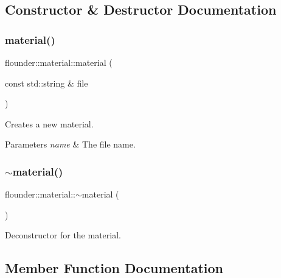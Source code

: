 \subsection{Constructor \& Destructor Documentation}
\mbox{\label{classflounder_1_1material_a92098b1119ad0fa59ca131410cbaf762}} 
\subsubsection{\texorpdfstring{material()}{material()}}
{\footnotesize\ttfamily flounder\+::material\+::material (\begin{DoxyParamCaption}\item[{const std\+::string \&}]{file }\end{DoxyParamCaption})}



Creates a new material. 


\begin{DoxyParams}{Parameters}
{\em name} & The file name. \\
\hline
\end{DoxyParams}
\mbox{\label{classflounder_1_1material_a9091fb3ad0368b98413568ccef5dbdb7}} 
\subsubsection{\texorpdfstring{$\sim$material()}{~material()}}
{\footnotesize\ttfamily flounder\+::material\+::$\sim$material (\begin{DoxyParamCaption}{ }\end{DoxyParamCaption})}



Deconstructor for the material. 



\subsection{Member Function Documentation}
\mbox{\label{classflounder_1_1material_a8f2af341dd47838604eee5a7f9157c31}} 
